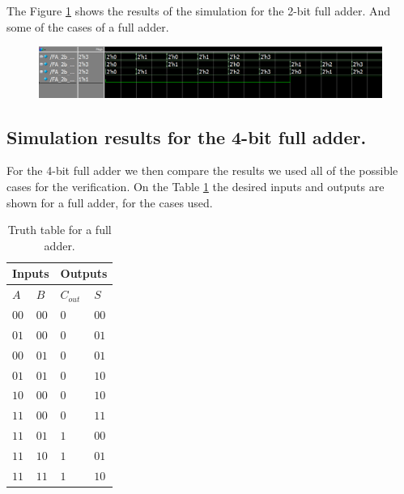\documentclass[conference]{IEEEtran}
\begin{document}
	The Figure \ref{fig:fa2bsim} shows the results of the simulation for the 2-bit full adder. And some of the cases of a full adder.
	
	\begin{figure}[H]
		\centering
		\includegraphics[width=0.9\columnwidth]{FA_2B_sim}
		\caption{}
		\label{fig:fa2bsim}
	\end{figure}
	
	\subsection{Simulation results for the 4-bit full adder.}
	
	For the 4-bit full adder we then compare the results we used all of the possible cases for the verification. On the Table \ref{tab:FA_4B_TT} the desired inputs and outputs are shown for a full adder, for the cases used.
	
	\begin{table}[H]
		\centering
		\begin{tabular}{|m{.2cm}|m{0.2cm}|m{0.5cm}|m{0.5cm}|}
			\hline
			\multicolumn{2}{|c|}{Inputs} & \multicolumn{2}{c|}{Outputs} \\
			\hline
			\(A\) & \(B\) & \(C_{out}\) & \(S\) \\
			\hline
			\centering\(00\) & \centering\(00\) & \centering\(0\) & \(00\) \\
			\centering\(01\) & \centering\(00\) & \centering\(0\) & \(01\) \\
			\centering\(00\) & \centering\(01\) & \centering\(0\) & \(01\) \\
			\centering\(01\) & \centering\(01\) & \centering\(0\) & \(10\) \\
			\centering\(10\) & \centering\(00\) & \centering\(0\) & \(10\) \\
			\centering\(11\) & \centering\(00\) & \centering\(0\) & \(11\) \\
			\centering\(11\) & \centering\(01\) & \centering\(1\) & \(00\) \\
			\centering\(11\) & \centering\(10\) & \centering\(1\) & \(01\) \\
			\centering\(11\) & \centering\(11\) & \centering\(1\) & \(10\) \\
			\hline
		\end{tabular}
		\caption{Truth table for a full adder.}
		\label{tab:FA_4B_TT}
	\end{table}
	
\end{document}
